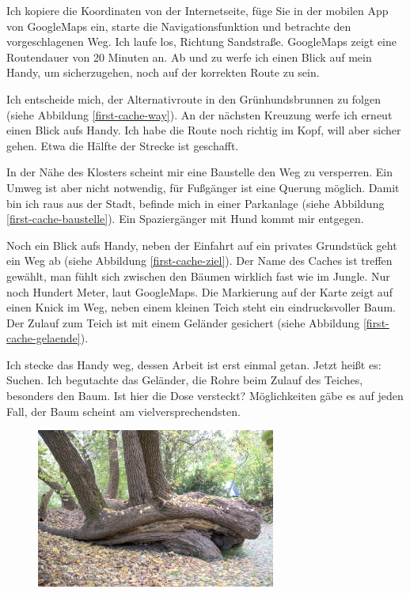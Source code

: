 Ich kopiere die Koordinaten von der Internetseite, füge Sie in der mobilen App von GoogleMaps ein, starte die Navigationsfunktion und betrachte den vorgeschlagenen Weg. Ich laufe los, Richtung Sandstraße. GoogleMaps zeigt eine Routendauer von 20 Minuten an. Ab und zu werfe ich einen Blick auf mein Handy, um sicherzugehen, noch auf der korrekten Route zu sein.

Ich entscheide mich, der Alternativroute in den Grünhundsbrunnen zu folgen (siehe Abbildung \ref{first-cache-way}). An der nächsten Kreuzung werfe ich erneut einen Blick aufs Handy. Ich habe die Route noch richtig im Kopf, will aber sicher gehen. Etwa die Hälfte der Strecke ist geschafft.

In der Nähe des Klosters scheint mir eine Baustelle den Weg zu versperren. Ein Umweg ist aber nicht notwendig, für Fußgänger ist eine Querung möglich. Damit bin ich raus aus der Stadt, befinde mich in einer Parkanlage (siehe Abbildung \ref{first-cache-baustelle}). Ein Spaziergänger mit Hund kommt mir entgegen.

Noch ein Blick aufs Handy, neben der Einfahrt auf ein privates Grundstück geht ein Weg ab (siehe Abbildung \ref{first-cache-ziel}). Der Name des Caches ist treffen gewählt, man fühlt sich zwischen den Bäumen wirklich fast wie im Jungle. Nur noch Hundert Meter, laut GoogleMaps. Die Markierung auf der Karte zeigt auf einen Knick im Weg, neben einem kleinen Teich steht ein eindrucksvoller Baum. Der Zulauf zum Teich ist mit einem Geländer gesichert (siehe Abbildung \ref{first-cache-gelaende}).

Ich stecke das Handy weg, dessen Arbeit ist erst einmal getan. Jetzt heißt es: Suchen. Ich begutachte das Geländer, die Rohre beim Zulauf des Teiches, besonders den Baum. Ist hier die Dose versteckt? Möglichkeiten gäbe es auf jeden Fall, der Baum scheint am vielversprechendsten.

\begin{figure}[H]
    \centering
    \includegraphics[width=0.7\textwidth]{figures/geocaching/first/IMG_3104.jpg}
\end{figure}


